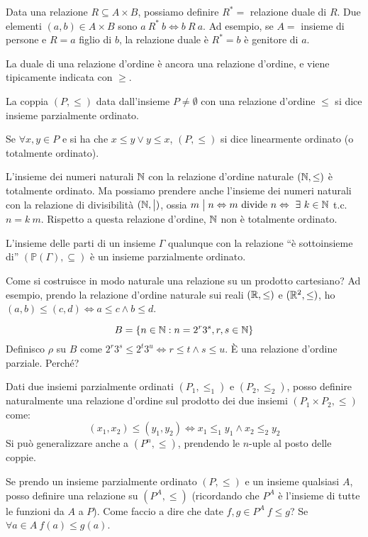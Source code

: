 Data una relazione $R \subseteq A \times B$, possiamo definire $R^{\ast} = $ relazione duale di $R$. Due elementi $(a,b) \in A \times B$ sono $a \ R^{\ast} \ b \iff b \ R \ a$. Ad esempio, se $A = $ insieme di persone e $R = a $ figlio di $b$, la relazione duale \`e $R^{\ast} = b $ \`e genitore di $a$.

La duale di una relazione d'ordine \`e ancora una relazione d'ordine, e viene tipicamente indicata con $\geq$.

La coppia $(P, \leq)$ data dall'insieme $P \neq \emptyset$ con una relazione d'ordine $\le$ si dice insieme parzialmente ordinato.

Se $\forall x, y \in P$ e si ha che $x \leq y \lor y \leq x$, $(P, \leq)$ si dice linearmente ordinato (o totalmente ordinato).

L'insieme dei numeri naturali $\mathbb{N}$ con la relazione d'ordine naturale $(\mathbb{N}, \leq)$ \`e totalmente ordinato. Ma possiamo prendere anche l'insieme dei numeri naturali con la relazione di divisibilit\`a $(\mathbb{N}, \bigm|)$, ossia $m \divides n \iff m \text{ divide } n \iff \exists k \in \naturals$ t.c. $n = k \ m$. Rispetto a questa relazione d'ordine, $\mathbb{N}$ non \`e totalmente ordinato.

L'insieme delle parti di un insieme $\Gamma$ qualunque con la relazione ``\`e sottoinsieme di'' $\left(\mathbb{P}(\Gamma), \subseteq \right)$ \`e un insieme parzialmente ordinato. 

Come si costruisce in modo naturale una relazione su un prodotto cartesiano? Ad esempio, prendo la relazione d'ordine naturale sui reali $(\mathbb{R}, \leq)$ e $(\mathbb{R}^2, \leq)$, ho $(a,b) \leq (c,d) \iff a \leq c \land b \leq d$.

\[
B = \{ n \in \mathbb{N} : n = 2^r 3^s, r, s \in \mathbb{N}\}
\]
Definisco $\rho$ su $B$ come $2^r 3^s \leq 2^t 3^u \iff r \leq t \land s \leq u$. \`E una relazione d'ordine parziale. Perch\'e?
\vspace{3cm}

\begin{defn}
Dati due insiemi parzialmente ordinati $(P_1, \le_1)$ e $(P_2, \le_2)$, posso definire naturalmente una relazione d'ordine sul prodotto dei due insiemi $(P_1 \times P_2, \le)$ come:
\[
(x_1, x_2) \le (y_1, y_2) \iff x_1 \le_1 y_1 \land x_2 \le_2 y_2
\]
Si pu\`o generalizzare anche a $(P^n, \le)$, prendendo le $n$-uple al posto delle coppie.
\end{defn}

\begin{defn}\label{ordine_funzioni}
Se prendo un insieme parzialmente ordinato $(P, \le)$ e un insieme qualsiasi $A$, posso definire una relazione su $(P^A, \le)$ (ricordando che $P^A$ \`e l'insieme di tutte le funzioni da $A$ a $P$). Come faccio a dire che date $f, g \in P^A \ f \le g$? Se $\forall a \in A \ f(a) \le g(a)$.
\end{defn}

